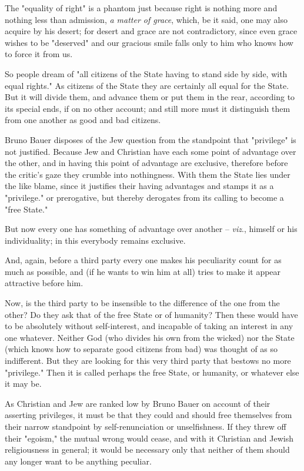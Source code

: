 The "{}equality of right"{} is a phantom just because right is nothing more 
and nothing less than admission, \textit{a matter of grace}, which, be it 
said, one may also acquire by his desert; for desert and grace are not 
contradictory, since even grace wishes to be "{}deserved"{} and our gracious 
smile falls only to him who knows how to force it from us.

So people dream of "{}all citizens of the State having to stand side by side, 
with equal rights."{} As citizens of the State they are certainly all equal 
for the State. But it will divide them, and advance them or put them in the 
rear, according to its special ends, if on no other account; and still more 
must it distinguish them from one another as good and bad citizens.

Bruno Bauer disposes of the Jew question from the standpoint that 
"{}privilege"{} is not justified. Because Jew and Christian have each some 
point of advantage over the other, and in having this point of advantage are 
exclusive, therefore before the critic's gaze they crumble into nothingness. 
With them the State lies under the like blame, since it justifies their having 
advantages and stamps it as a "{}privilege."{} or prerogative, but thereby 
derogates from its calling to become a "{}free State."{}

But now every one has something of advantage over another -- \textit{viz}., 
himself or his individuality; in this everybody remains exclusive.

And, again, before a third party every one makes his peculiarity count for as 
much as possible, and (if he wants to win him at all) tries to make it appear 
attractive before him.

Now, is the third party to be insensible to the difference of the one from the 
other? Do they ask that of the free State or of humanity? Then these would 
have to be absolutely without self-interest, and incapable of taking an 
interest in any one whatever. Neither God (who divides his own from the 
wicked) nor the State (which knows how to separate good citizens from bad) was 
thought of as so indifferent. But they are looking for this very third party 
that bestows no more "{}privilege."{} Then it is called perhaps the free 
State, or humanity, or whatever else it may be.

As Christian and Jew are ranked low by Bruno Bauer on account of their 
asserting privileges, it must be that they could and should free themselves 
from their narrow standpoint by self-renunciation or unselfishness. If they 
threw off their "{}egoism,"{} the mutual wrong would cease, and with it 
Christian and Jewish religiousness in general; it would be necessary only that 
neither of them should any longer want to be anything peculiar.

